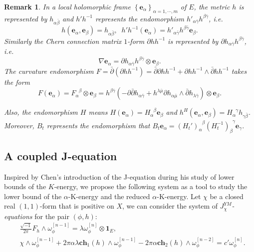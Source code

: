 \documentclass[10pt, letterpaper]{amsart}
\theoremstyle{plain}
\newtheorem{remark}[theorem]{Remark}
\theoremstyle{definition}
\numberwithin{equation}{section}
\begin{document}
\begin{remark}
	In a local holomorphic frame $\left\{ \mathbf{e}_\alpha\right\}_{\alpha=1,\cdots, m}$ of $E$, the metric $h$ is represented by $h_{\alpha\bar\beta}$ and $h'h^{-1}$ represents the endomorphism $h'_{\alpha\bar\gamma}h^{\beta\bar\gamma}$, i.e. 
	\[
	h\left( \mathbf{e}_\alpha, \mathbf{e}_\beta\right) = h_{\alpha\bar \beta}, \;\; 
	h'h^{-1}\left(\mathbf{e}_\alpha\right) = 
	h'_{\alpha\bar\gamma}h^{\beta\bar \gamma}\mathbf{e}_\beta.
	\]
	Similarly  the Chern connection matrix $1$-form $\partial hh^{-1}$ is represented by $\partial h_{\alpha\bar\gamma}h^{\beta\bar\gamma}$, i.e. 
	\[
	\nabla \mathbf{e}_\alpha 
	= 
	\partial h_{\alpha\bar\gamma}h^{\beta\bar\gamma}\otimes \mathbf{e}_\beta.
	\]
	The curvature endomorphism $F=\bar\partial \left(\partial hh^{-1}\right)= \bar\partial \partial hh^{-1} + \partial hh^{-1}\wedge \bar\partial hh^{-1}$ takes the form 
	\[
	F(\mathbf{e}_\alpha)
	=
	F_\alpha^{\phantom{\alpha}\beta}\otimes \mathbf{e}_\beta
	=
	h^{\beta\bar\gamma}\left( - \partial\bar\partial h_{\alpha\bar\gamma} 
	+ 
	h^{\lambda\bar\mu}\partial h_{\alpha\bar\mu}\wedge\bar\partial h_{\lambda\bar\gamma}\right)\otimes \mathbf{e}_\beta.
	\]

\noindent Also, the endomorphism $H$ means $H\left(\mathbf e_\alpha\right)=H_\alpha^{\phantom{\alpha}\beta}\mathbf e_\beta$ and $h^H\left(\mathbf e_\alpha,\mathbf e_\beta\right)=H_\alpha^{\phantom{\alpha}\gamma}h_{\gamma\bar \beta}$. Moreover, $B_t$ represents the endomorphism that $B_t\mathbf e_\alpha=\left(H_t'\right)_\alpha^{\phantom{\alpha}\beta}\left(H_t^{-1}\right)_\beta^{\phantom{\beta}\gamma}\mathbf e_\gamma$.
\end{remark}


\subsection{A coupled J-equation} Inspired by Chen's introduction of the J-equation \cite{XX1} during his study of lower bounds of the $K$-energy, we propose the following system as a tool to study the lower bound of the $\alpha$-K-energy and the reduced $\alpha$-K-energy. Let $\chi$ be a closed real $(1,1)$-form that is positive on $X$, we can consider the system of \emph{ $J_\chi^{YM}$-equations} for the pair $\left(\phi,h\right)$: 
\begin{equation}
\begin{split}
&\frac{\sqrt{-1}}{2\pi}F_{h}\wedge \omega _{\phi} ^{[n-1]}  = \lambda \omega _{\phi} ^{[n]} \otimes \mathbf{1}_E,\\
&\chi\wedge \omega_\phi^{[n-1]}
    + 
    2\pi\alpha\lambda \mathbf{ch}_1\left(h\right)\wedge \omega_\phi^{[n-1]}
    -
    2\pi\alpha \mathbf{ch}_2\left(h\right)\wedge\omega_\phi^{[n-2]}
    = 
    c'\omega_\phi^{[n]}.
\label{Chi-Yang-Mills-sys}
\end{split}
\end{equation}
\end{document}
